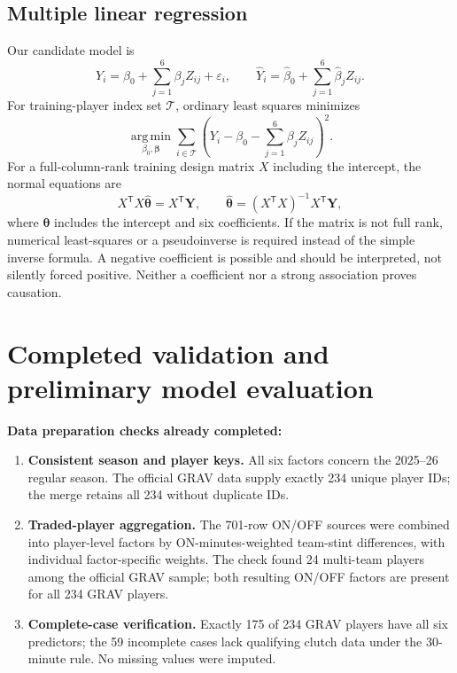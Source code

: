 \documentclass[11pt]{article}
\begin{document}
\subsection{Multiple linear regression}
Our candidate model is
\begin{equation}
Y_i=\beta_0+\sum_{j=1}^{6}\beta_j Z_{ij}+\varepsilon_i,
\qquad
\widehat Y_i=\widehat\beta_0+\sum_{j=1}^{6}\widehat\beta_j Z_{ij}.
\label{eq:ols}
\end{equation}
For training-player index set $\mathcal T$, ordinary least squares minimizes
\begin{equation}
\underset{\beta_0,\boldsymbol\beta}{\operatorname{arg\,min}}
\sum_{i\in\mathcal T}
\left(Y_i-\beta_0-\sum_{j=1}^{6}\beta_jZ_{ij}\right)^2.
\label{eq:least-squares}
\end{equation}
For a full-column-rank training design matrix $X$ including the intercept,
the normal equations are
\begin{equation}
X^{\mathsf T}X\widehat{\boldsymbol\theta}=X^{\mathsf T}\mathbf Y,
\qquad
\widehat{\boldsymbol\theta}=(X^{\mathsf T}X)^{-1}X^{\mathsf T}\mathbf Y,
\label{eq:normal}
\end{equation}
where $\boldsymbol\theta$ includes the intercept and six coefficients.
If the matrix is not full rank, numerical least-squares or a pseudoinverse is
required instead of the simple inverse formula. A negative coefficient is
possible and should be interpreted, not silently forced positive. Neither a
coefficient nor a strong association proves causation.

\section{Completed validation and preliminary model evaluation}
\label{sec:model-evaluation}
\textbf{Data preparation checks already completed:}
\begin{enumerate}
\item \textbf{Consistent season and player keys.} All six factors concern
the 2025--26 regular season. The official GRAV data supply exactly 234
unique player IDs; the merge retains all 234 without duplicate IDs.
\item \textbf{Traded-player aggregation.} The 701-row ON/OFF sources were
combined into player-level factors by ON-minutes-weighted team-stint
differences, with individual factor-specific weights. The check found
24 multi-team players among the official GRAV sample; both resulting
ON/OFF factors are present for all 234 GRAV players.
\item \textbf{Complete-case verification.} Exactly 175 of 234 GRAV players
have all six predictors; the 59 incomplete cases lack qualifying clutch
data under the 30-minute rule. No missing values were imputed.
\end{enumerate}
\end{document}
